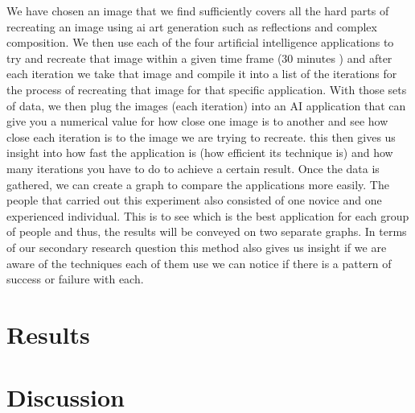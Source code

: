 \documentclass[]{report}
\begin{document}
	We have chosen an image that we find sufficiently covers all the hard parts of recreating an image using ai art generation such as reflections and complex composition. We then use each of the four artificial intelligence applications to try and recreate that image within a given time frame (30 minutes ) and after each iteration we take that image and compile it into a list of the iterations for the process of recreating that image for that specific application. With those sets of data, we then plug the images (each iteration) into an AI application that can give you a numerical value for how close one image is to another and see how close each iteration is to the image we are trying to recreate. this then gives us insight into how fast the application is (how efficient its technique is) and how many iterations you have to do to achieve a certain result. Once the data is gathered, we can create a graph to compare the applications more easily. The people that carried out this experiment also consisted of one novice and one experienced individual. This is to see which is the best application for each group of people and thus, the results will be conveyed on two separate graphs. In terms of our secondary research question this method also gives us insight if we are aware of the techniques each of them use we can notice if there is a pattern of success or failure with each.
	
	
	
	\section{Results}
	\newpage	
	\section{Discussion}
	
\end{document}
